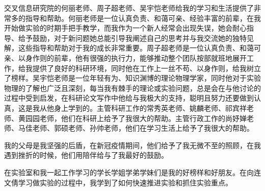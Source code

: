 \begin{acknowledgements}
  交叉信息研究院的何丽老师、周子超老师、吴宇恺老师给我的学习和生活提供了非常多的指导和帮助。何丽老师是一位认真负责、和蔼可亲、经验丰富的前辈，在我开始做实验的时期手把手教学，而我作为一个新人经常会出现失误，她会耐心指导、给予鼓励，对于新问题她总能引导我阐述自己的思考并与我交流她的独特见解，这些指导和帮助对于我的成长非常重要。周子超老师是一位认真负责、和蔼可亲、以身作则的前辈，他有很强的执行力，能够推动整个团队按部就班地展开工作，给我提供了良好的科研环境，同时他在工作上一丝不苟、以身作则，给我树立了榜样。吴宇恺老师是一位年轻有为、知识渊博的理论物理学家，同时他对于实验物理的了解也广泛且深刻，每当我有棘手的理论或实验问题，总是会在与他讨论的过程中受到启发，在科研论文写作中他给与我极大的支持，聪明且努力还要做到认真，这是我从他身上学到的。主管科研工作的常秀英老师、姚麟老师、祁宾祥老师、黄园园老师，他们在科研上给予了我很大的帮助。主管行政工作的尚妤婵老师、马佳老师、郭硕老师、孙帅老师，他们在学习生活上给予了我很大的帮助。

  我的父母是我坚强的后盾，在新冠疫情期间，他们给予了我无微不至的照顾，在我遇到挫折的时候，他们用陪伴给与了我最好的鼓励。

  在实验室和我一起工作学习的学长学姐学弟学妹们是我的好榜样和好朋友。在向连文倩学习做实验的过程中，我学到了如何快速推进实验和抓住实验重点。


\end{acknowledgements}
